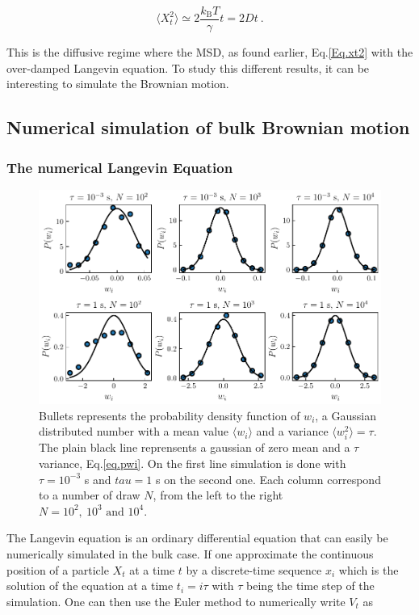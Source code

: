 \begin{equation}
	\langle X_t ^2 \rangle \simeq 2 \frac{k_\mathrm{B}T}{\gamma} t = 2Dt ~.
	\label{eq:longtimemsd}
\end{equation}

This is the diffusive regime where the \gls{MSD}, as found earlier, Eq.\ref{Eq.xt2} with the over-damped Langevin equation. To study this different results, it can be interesting to simulate the Brownian motion.

\subsection{Numerical simulation of bulk Brownian motion}

\subsubsection{The numerical Langevin Equation}

\begin{figure}[!hb]
	\centering
	\includegraphics{02_body/chapter1/image/noise_simulation/exemple.pdf}
	\caption{Bullets represents the probability density function of $w_i$, a Gaussian distributed number with a mean value $\langle w_i \rangle$ and a variance $\langle w_i ^2 \rangle  = \tau$. The plain black line reprensents a gaussian of zero mean and a $\tau$ variance, Eq.\ref{eq.pwi}. On the first line simulation is done with $\tau = 10^{-3}$ s and $tau = 1$ s on the second one. Each column correspond to a number of draw $N$, from the left to the right $N=10^2, ~10^3 \text{ and } 10^4$. }
	\label{fig:exempleprecisionwi}
\end{figure}


The Langevin equation is an ordinary differential equation that can easily be numerically simulated in the bulk case. If one approximate the continuous position of a particle $X_t$ at a time $t$ by a discrete-time sequence $x_i$ which is the solution of the equation at a time $t_i = i  \tau$ with $\tau$ being the time step of the simulation. One can then use the Euler method to numerically write $V_t$ as


